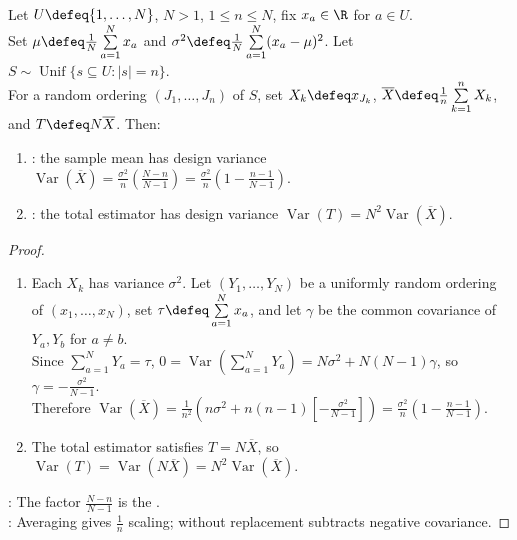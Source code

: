 \begin{theorem} \label{thm:srs-sample-mean-variance} \\
Let $U\defeq\{1,\ldots,N\}$, $N>1$, $1\leq n\leq N$, fix $x_a\in\R$ for $a\in U$.\\
Set $\mu\defeq \frac{1}{N}\sum\limits_{a=1}^{N}x_a$ and $\sigma^2\defeq \frac{1}{N}\sum\limits_{a=1}^{N}(x_a-\mu)^2$. Let $S\sim\operatorname{Unif}\{s\subseteq U:|s|=n\}$.\\
For a random ordering $(J_1,\ldots,J_n)$ of $S$, set $X_k\defeq x_{J_k}$, $\overline{X}\defeq \frac{1}{n}\sum\limits_{k=1}^{n}X_k$, and $T\defeq N\overline{X}$. Then:
\begin{enumerate}[label=(\roman*)]
\setlength{\itemsep}{0pt}
\item {}: the sample mean has design variance $\operatorname{Var}(\overline{X})=\frac{\sigma^2}{n}\left(\frac{N-n}{N-1}\right)=\frac{\sigma^2}{n}\left(1-\frac{n-1}{N-1}\right)$.
\item {}: the total estimator has design variance $\operatorname{Var}(T)=N^2\operatorname{Var}(\overline{X})$.
\end{enumerate}
\begin{proof}
\begin{enumerate}[label=(\roman*)]
\setlength{\itemsep}{0pt}
\item Each $X_k$ has variance $\sigma^2$.  Let $(Y_1,\ldots,Y_N)$ be a uniformly random ordering of $(x_1,\ldots,x_N)$, set $\tau\defeq\sum\limits_{a=1}^{N}x_a$, and let $\gamma$ be the common covariance of $Y_a,Y_b$ for $a\neq b$.\\
Since $\sum\limits_{a=1}^{N}Y_a=\tau$, $0=\operatorname{Var}(\sum\limits_{a=1}^{N}Y_a)=N\sigma^2+N(N-1)\gamma$, so $\gamma=-\frac{\sigma^2}{N-1}$.\\
Therefore $\operatorname{Var}(\overline{X}) =\frac1{n^2}\left(n\sigma^2+n(n-1)\left[-\frac{\sigma^2}{N-1}\right]\right) =\frac{\sigma^2}{n}\left(1-\frac{n-1}{N-1}\right)$.
\item The total estimator satisfies $T=N\overline{X}$, so $\operatorname{Var}(T)=\operatorname{Var}(N\overline{X})=N^2\operatorname{Var}(\overline{X})$.
\end{enumerate}
: The factor $\frac{N-n}{N-1}$ is the .\\
: Averaging gives $\frac{1}{n}$ scaling; without replacement subtracts negative covariance.
\end{proof}
\end{theorem}

